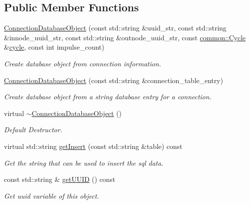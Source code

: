 \subsection*{\-Public \-Member \-Functions}
\begin{DoxyCompactItemize}
\item 
\hyperlink{classcryomesh_1_1manager_1_1ConnectionDatabaseObject_a62f33a7c826d115aa981d3cca149e14b}{\-Connection\-Database\-Object} (const std\-::string \&uuid\-\_\-str, const std\-::string \&innode\-\_\-uuid\-\_\-str, const std\-::string \&outnode\-\_\-uuid\-\_\-str, const \hyperlink{classcryomesh_1_1common_1_1Cycle}{common\-::\-Cycle} \&\hyperlink{classcryomesh_1_1manager_1_1ConnectionDatabaseObject_a481ed7a285f11016e6f6182293cca49f}{cycle}, const int impulse\-\_\-count)
\begin{DoxyCompactList}\small\item\em \-Create database object from connection information. \end{DoxyCompactList}\item 
\hyperlink{classcryomesh_1_1manager_1_1ConnectionDatabaseObject_a8e38ce2ee538fc20ce2c2f04b6abce79}{\-Connection\-Database\-Object} (const std\-::string \&connection\-\_\-table\-\_\-entry)
\begin{DoxyCompactList}\small\item\em \-Create database object from a string database entry for a connection. \end{DoxyCompactList}\item 
virtual \hyperlink{classcryomesh_1_1manager_1_1ConnectionDatabaseObject_a1c34c6c64fcfc7c2aebc714b7b37d059}{$\sim$\-Connection\-Database\-Object} ()
\begin{DoxyCompactList}\small\item\em \-Default \-Destructor. \end{DoxyCompactList}\item 
virtual std\-::string \hyperlink{classcryomesh_1_1manager_1_1ConnectionDatabaseObject_ac7b22d25a4366175fd7d1578f476b125}{get\-Insert} (const std\-::string \&table) const 
\begin{DoxyCompactList}\small\item\em \-Get the string that can be used to insert the sql data. \end{DoxyCompactList}\item 
const std\-::string \& \hyperlink{classcryomesh_1_1manager_1_1ConnectionDatabaseObject_aa310082cf95a704640a068db4a328803}{get\-U\-U\-I\-D} () const 
\begin{DoxyCompactList}\small\item\em \-Get uuid variable of this object. \end{DoxyCompactList}\item 

\end{DoxyCompactItemize}

